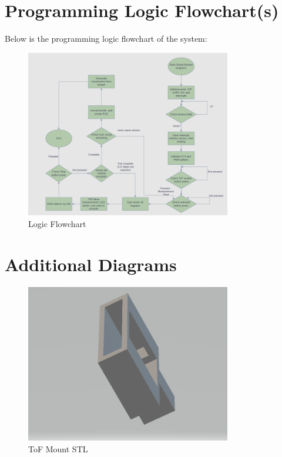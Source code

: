\documentclass[12pt, letterpaper]{article}
\begin{document}
\section{Programming Logic Flowchart(s)}
Below is the programming logic flowchart of the system:
\begin{figure}[htbp]
\centering
\includegraphics[width=0.8\textwidth]{images/chart.png}
\caption{Logic Flowchart}
\end{figure}
\newpage
\section{Additional Diagrams}
\begin{figure}[htbp]
\centering
\includegraphics[width=0.8\textwidth]{images/mount.png}
\caption{ToF Mount STL}
\end{figure}
\end{document}
